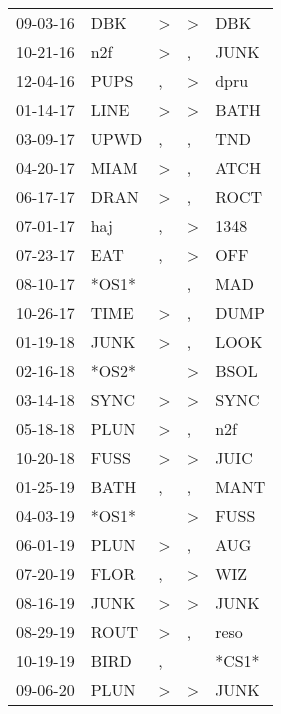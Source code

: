 \begin{supertabular}{lllll}
 09-03-16 &    DBK &     \textgreater &     \textgreater &    DBK \\
 10-21-16 &    n2f &     \textgreater &                , &   JUNK \\
 12-04-16 &   PUPS &                , &     \textgreater &   dpru \\
 01-14-17 &   LINE &     \textgreater &     \textgreater &   BATH \\
 03-09-17 &   UPWD &                , &                , &    TND \\
 04-20-17 &   MIAM &     \textgreater &                , &   ATCH \\
 06-17-17 &   DRAN &     \textgreater &                , &   ROCT \\
 07-01-17 &    haj &                , &     \textgreater &   1348 \\
 07-23-17 &    EAT &                , &     \textgreater &    OFF \\
 08-10-17 &  *OS1* &                  &                , &    MAD \\
 10-26-17 &   TIME &     \textgreater &                , &   DUMP \\
 01-19-18 &   JUNK &     \textgreater &                , &   LOOK \\
 02-16-18 &  *OS2* &                  &     \textgreater &   BSOL \\
 03-14-18 &   SYNC &     \textgreater &     \textgreater &   SYNC \\
 05-18-18 &   PLUN &     \textgreater &                , &    n2f \\
 10-20-18 &   FUSS &     \textgreater &     \textgreater &   JUIC \\
 01-25-19 &   BATH &                , &                , &   MANT \\
 04-03-19 &  *OS1* &                  &     \textgreater &   FUSS \\
 06-01-19 &   PLUN &     \textgreater &                , &    AUG \\
 07-20-19 &   FLOR &                , &     \textgreater &    WIZ \\
 08-16-19 &   JUNK &     \textgreater &     \textgreater &   JUNK \\
 08-29-19 &   ROUT &     \textgreater &                , &   reso \\
 10-19-19 &   BIRD &                , &                  &  *CS1* \\
 09-06-20 &   PLUN &     \textgreater &     \textgreater &   JUNK \\
\end{supertabular}
